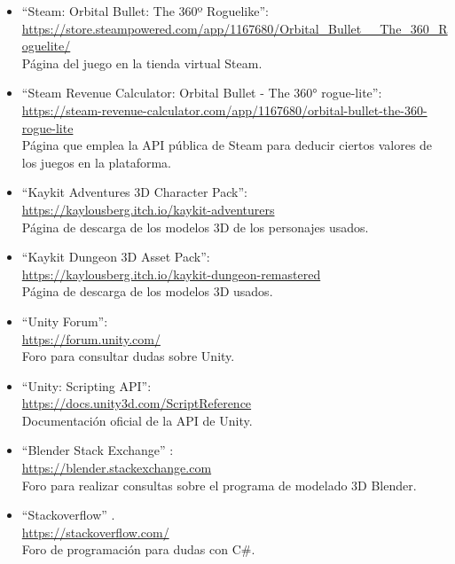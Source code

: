 \documentclass{article}
\begin{document}
\begin{itemize}

    \item “Steam: Orbital Bullet: The 360º Roguelike”: \\
    \url{https://store.steampowered.com/app/1167680/Orbital_Bullet__The_360_Roguelite/} \\
    Página del juego en la tienda virtual Steam. 
    
    \item “Steam Revenue Calculator: Orbital Bullet - The 360° rogue-lite”: \\
    \url{https://steam-revenue-calculator.com/app/1167680/orbital-bullet-the-360-rogue-lite} \\
    Página que emplea la API pública de Steam para deducir ciertos valores de los juegos en la plataforma. 

    \item “Kaykit Adventures 3D Character Pack”: \\
    \url{https://kaylousberg.itch.io/kaykit-adventurers} \\
    Página de descarga de los modelos 3D de los personajes usados.

    \item “Kaykit Dungeon 3D Asset Pack”: \\
    \url{https://kaylousberg.itch.io/kaykit-dungeon-remastered} \\
    Página de descarga de los modelos 3D usados.

    \item “Unity Forum”: \\
    \url{https://forum.unity.com/} \\
    Foro para consultar dudas sobre Unity.

    \item “Unity: Scripting API”: \\
    \url{https://docs.unity3d.com/ScriptReference} \\
    Documentación oficial de la API de Unity.

    \item “Blender Stack Exchange” : \\
    \url{https://blender.stackexchange.com} \\
    Foro para realizar consultas sobre el programa de modelado 3D Blender.

    \item “Stackoverflow” . \\
    \url{https://stackoverflow.com/} \\
    Foro de programación para dudas con C\#.
\end{itemize}
\end{document}
